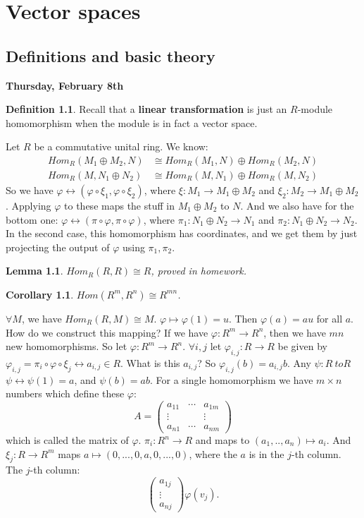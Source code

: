 \documentclass[9pt,reqno,twoside]{amsbook}
\theoremstyle{plain}
\numberwithin{section}{chapter}
\numberwithin{equation}{chapter}
\newtheorem{lem}[theorem]{Lemma}
\newtheorem{Cor}[theorem]{Corollary}
\theoremstyle{definition}
\newtheorem{Def}[theorem]{Definition}
\theoremstyle{remark}
\theoremstyle{plain}
\newcommand{\bee}{\begin{equation}\begin{aligned}}
\newcommand{\eee}{\end{aligned}\end{equation}}
\newcommand{\lpar}{\left(}
\newcommand{\rpar}{\right)}
\renewcommand{\phi}{\varphi}
\begin{document}
\chapter{Vector spaces}

\section{Definitions and basic theory}

\textbf{Thursday, February 8th}

\begin{Def}
Recall that a \textbf{linear transformation} is just an $R$-module homomorphism when the module is in fact a vector space. 
\end{Def}

Let $R$ be a commutative unital ring. We know:
\bee
Hom_R(M_1 \oplus M_2,N) &\cong Hom_R(M_1,N) \oplus Hom_R(M_2,N)\\
Hom_R(M,N_1 \oplus N_2) &\cong Hom_R(M,N_1) \oplus Hom_R(M,N_2)
\eee
So we have $\phi\leftrightarrow(\phi \circ \xi_1, \phi \circ \xi_2)$, where $\xi:M_1 \to M_1 \oplus M_2$ and $\xi_2:M_2 \to M_1 \oplus M_2$. Applying $\phi$ to these maps the stuff in $M_1 \oplus M_2$ to $N$. And we also have for the bottom one: $\phi \leftrightarrow(\pi \circ \phi, \pi \circ \phi)$, where $\pi_1:N_1 \oplus N_2 \to N_1$ and $\pi_2:N_1 \oplus N_2 \to N_2$. In the second case, this homomorphism has coordinates, and we get them by just projecting the output of $\phi$ using $\pi_1,\pi_2$. 

\begin{lem}
$Hom_R(R,R) \cong R$, proved in homework. 
\end{lem}
\begin{Cor}\label{cor113}
$Hom(R^m,R^n) \cong R^{mn}$. 
\end{Cor}

$\forall M$, we have $Hom_R(R,M) \cong M$. $\phi \mapsto \phi(1) = u$. Then $\phi(a) = au$ for all $a$. How do we construct this mapping? If we have $\phi: R^m \to R^n$, then we have $mn$ new homomorphisms. So let $\phi:R^m \to R^n$. $\forall i,j$ let $\phi_{i,j}: R \to R$ be given by $\phi_{i,j} = \pi_i \circ \phi \circ \xi_j \leftrightarrow a_{i,j} \in R$. What is this $a_{i,j}$? So $\phi_{i,j}(b) = a_{i,j}b$. Any $\psi:R\ to R$ $\psi \leftrightarrow \psi(1) = a$, and $\psi(b) = ab$. For a single homomorphism we have $m \times n$ numbers which define these $\phi$:
$$
A = \lpar 
\begin{matrix}
a_{11}& \cdots &a_{1m}\\
\vdots & & \vdots\\
a_{n1}& \cdots & a_{nm}
\end{matrix} \rpar 
$$
which is called the matrix of $\phi$. $\pi_i: R^n \to R$ and maps to $(a_1,..,a_n) \mapsto a_i$. And $\xi_j:R\to R^m$ maps $a \mapsto (0,...,0,a,0,...,0)$, where the $a$ is in the $j$-th column. The $j$-th column:
$$
\lpar 
\begin{matrix}
a_{1j}\\
\vdots\\
a_{nj}
\end{matrix} \rpar  \phi(v_j).
$$
\end{document}
